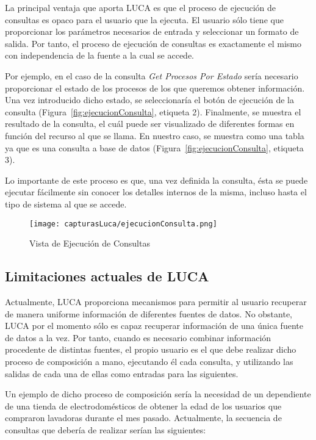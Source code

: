 La principal ventaja que aporta LUCA es que el proceso de ejecución de consultas es opaco para el usuario que la ejecuta. El usuario sólo tiene que proporcionar los parámetros necesarios de entrada y seleccionar un formato de salida. Por tanto, el proceso de ejecución de consultas es exactamente el mismo con independencia de la fuente a la cual se accede.

Por ejemplo, en el caso de la consulta \emph{Get Procesos Por Estado} sería necesario proporcionar el estado de los procesos de los que queremos obtener información. Una vez introducido dicho estado, se seleccionaría el botón de ejecución de la consulta (Figura~\ref{fig:ejecucionConsulta}, etiqueta 2). Finalmente, se muestra el resultado de la consulta, el cuál puede ser visualizado de diferentes formas en función del recurso al que se llama. En nuestro caso, se muestra como una tabla ya que es una consulta a base de datos (Figura~\ref{fig:ejecucionConsulta}, etiqueta 3).

Lo importante de este proceso es que, una vez definida la consulta, ésta se puede ejecutar fácilmente sin conocer los detalles internos de la misma, incluso hasta el tipo de sistema al que se accede.

	\begin{figure}[!tb]
		\centering
		\texttt{[image: capturasLuca/ejecucionConsulta.png]}
		\caption{Vista de Ejecución de Consultas}\label{fig:ejecucionConsultas}
	\end{figure}

\subsection{Limitaciones actuales de LUCA}

Actualmente, LUCA proporciona mecanismos para permitir al usuario recuperar de manera uniforme información de diferentes fuentes de datos. No obstante, LUCA por el momento sólo es capaz recuperar información de una única fuente de datos a la vez. Por tanto, cuando es necesario combinar información procedente de distintas fuentes, el propio usuario es el que debe realizar dicho proceso de composición a mano, ejecutando él cada consulta, y utilizando las salidas de cada una de ellas como entradas para las siguientes.


Un ejemplo de dicho proceso de composición sería la necesidad de un dependiente de una tienda de electrodomésticos de obtener la edad de los usuarios que compraron lavadoras durante el mes pasado. Actualmente, la secuencia de consultas que debería de realizar serían las siguientes:


